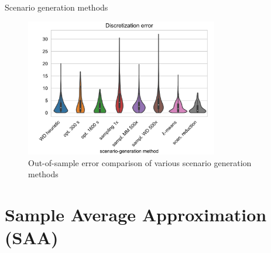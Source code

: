 \begin{frame}{Scenario generation methods}
	\begin{figure}
		\includegraphics[width=0.75\textwidth]{figures/comparison-scengen.pdf}
		\vspace{6pt}
		\caption{Out-of-sample error comparison of various scenario generation methods \cite{kaut2021scenario}}  
	\end{figure}
\end{frame}



\section{Sample Average Approximation (SAA)}

